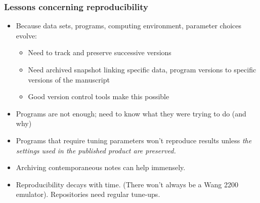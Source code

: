 \begin{frame}
	\frametitle{Lessons concerning reproducibility}
	
\begin{itemize}
	\item Because {\color{ForestGreen}data sets, programs, computing environment, parameter choices} evolve:
	\begin{itemize}
		\item Need to track and preserve successive versions
		\item Need archived snapshot linking specific data, program versions to specific versions of the manuscript
		\item Good version control tools make this possible
	\end{itemize}
	\item Programs are not enough; need to know what they were trying to do (and why)
	\item Programs that require tuning parameters won't reproduce results unless \textit{the settings used in the published product are preserved.}
	\item Archiving contemporaneous notes can help immensely.
	\item Reproducibility decays with time. (There won't always be a Wang 2200 emulator). Repositories need regular tune-ups.
\end{itemize}	
\end{frame}

